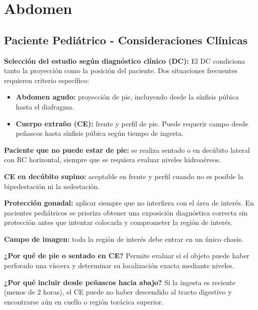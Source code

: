 	
	
	\section{Abdomen}
	
	\subsection{Paciente Pediátrico - Consideraciones Clínicas}
	
	\textbf{Selección del estudio según diagnóstico clínico (DC):}
	El DC condiciona tanto la proyección como la posición del paciente. Dos situaciones frecuentes requieren criterio específico:
	
	\begin{itemize}
		\item \textbf{Abdomen agudo:} proyección de pie, incluyendo desde la sínfisis púbica hasta el diafragma.
		\item \textbf{Cuerpo extraño (CE):} frente y perfil de pie. Puede requerir campo desde peñascos hasta sínfisis púbica según tiempo de ingesta.
	\end{itemize}
	
	\textbf{Paciente que no puede estar de pie:} se realiza sentado o en decúbito lateral con RC horizontal, siempre que se requiera evaluar niveles hidroaéreos.
	
	\textbf{CE en decúbito supino:} aceptable en frente y perfil cuando no es posible la bipedestación ni la sedestación.
	
	\textbf{Protección gonadal:} aplicar siempre que no interfiera con el área de interés. En pacientes pediátricos se prioriza obtener una exposición diagnóstica correcta sin protección antes que intentar colocarla y comprometer la región de interés.
	
	\textbf{Campo de imagen:} toda la región de interés debe entrar en un único chasis.
	
	\medskip
	
	\textbf{¿Por qué de pie o sentado en CE?} Permite evaluar si el objeto puede haber perforado una víscera y determinar su localización exacta mediante niveles.
	
	\textbf{¿Por qué incluir desde peñascos hacia abajo?} Si la ingesta es reciente (menos de 2 horas), el CE puede no haber descendido al tracto digestivo y encontrarse aún en cuello o región torácica superior.
	
